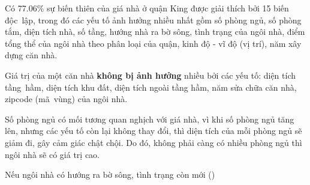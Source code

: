 Có 77.06\% sự biến thiên của giá nhà ở quận King được giải thích bởi 15 biến độc~lập, trong đó các yếu tố ảnh hưởng nhiều nhất gồm số phòng ngủ, số phòng tắm, diện tích nhà, số tầng, hướng nhà ra bờ sông, tình trạng của ngôi nhà, điểm tổng thể của ngôi nhà theo phân loại của quận, kinh độ - vĩ độ (vị trí), năm xây dựng căn nhà.

Giá trị của một căn nhà \textbf{không bị ảnh hưởng} nhiều bởi các yếu tố: diện tích tầng~hầm, diện tích khu đất, diện tích ngoài tầng hầm, năm sửa chữa căn nhà, zipcode (mã~vùng) của ngôi nhà. 

Số phòng ngủ có mối tương quan nghịch với giá nhà, vì khi số phòng ngủ tăng lên, nhưng các yếu tố còn lại không thay đổi, thì diện tích của mỗi phòng ngủ sẽ giảm đi, gây cảm giác chật chội. Do đó, không phải càng có nhiều phòng ngủ thì ngôi nhà sẽ có giá trị cao. 

Nếu ngôi nhà có hướng ra bờ sông, tình trạng còn mới ()
